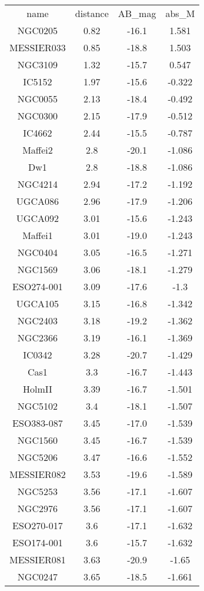 \begin{table}
\begin{tabular}{cccc}
name & distance & AB_mag & abs_M \\
NGC0205 & 0.82 & -16.1 & 1.581 \\
MESSIER033 & 0.85 & -18.8 & 1.503 \\
NGC3109 & 1.32 & -15.7 & 0.547 \\
IC5152 & 1.97 & -15.6 & -0.322 \\
NGC0055 & 2.13 & -18.4 & -0.492 \\
NGC0300 & 2.15 & -17.9 & -0.512 \\
IC4662 & 2.44 & -15.5 & -0.787 \\
Maffei2 & 2.8 & -20.1 & -1.086 \\
Dw1 & 2.8 & -18.8 & -1.086 \\
NGC4214 & 2.94 & -17.2 & -1.192 \\
UGCA086 & 2.96 & -17.9 & -1.206 \\
UGCA092 & 3.01 & -15.6 & -1.243 \\
Maffei1 & 3.01 & -19.0 & -1.243 \\
NGC0404 & 3.05 & -16.5 & -1.271 \\
NGC1569 & 3.06 & -18.1 & -1.279 \\
ESO274-001 & 3.09 & -17.6 & -1.3 \\
UGCA105 & 3.15 & -16.8 & -1.342 \\
NGC2403 & 3.18 & -19.2 & -1.362 \\
NGC2366 & 3.19 & -16.1 & -1.369 \\
IC0342 & 3.28 & -20.7 & -1.429 \\
Cas1 & 3.3 & -16.7 & -1.443 \\
HolmII & 3.39 & -16.7 & -1.501 \\
NGC5102 & 3.4 & -18.1 & -1.507 \\
ESO383-087 & 3.45 & -17.0 & -1.539 \\
NGC1560 & 3.45 & -16.7 & -1.539 \\
NGC5206 & 3.47 & -16.6 & -1.552 \\
MESSIER082 & 3.53 & -19.6 & -1.589 \\
NGC5253 & 3.56 & -17.1 & -1.607 \\
NGC2976 & 3.56 & -17.1 & -1.607 \\
ESO270-017 & 3.6 & -17.1 & -1.632 \\
ESO174-001 & 3.6 & -15.7 & -1.632 \\
MESSIER081 & 3.63 & -20.9 & -1.65 \\
NGC0247 & 3.65 & -18.5 & -1.661 \\

\end{tabular}
\end{table}
